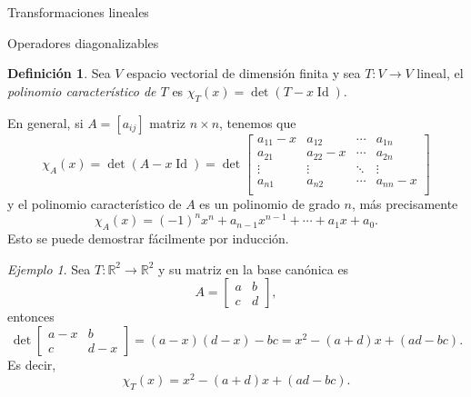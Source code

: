 \documentclass[a4paper,12pt,twoside,spanish,reqno]{amsbook}
\numberwithin{equation}{section}
\theoremstyle{definition}
\newtheorem{definicion}[teorema]{Definici\'on}
\theoremstyle{remark}
\newtheorem*{ejemplo*}{Ejemplo}
\newcommand{\Id}{\operatorname{Id}}
\newcommand{\R}{\mathbb R}
\begin{document}
\begin{chapter}{Transformaciones lineales}
\begin{section}{Operadores diagonalizables}
\begin{definicion}
            Sea $V$ espacio vectorial de dimensión finita y sea $T: V \to V$ lineal, el  \textit{polinomio característico de $T$} es $\chi_T(x) = \det(T- x \Id)$.
        \end{definicion}
    
            
        En general,  si $A = [a_{ij}]$ matriz $n \times n$, tenemos que
        \begin{equation}
        \chi_A(x) = \det(A- x\Id) = \det
        \begin{bmatrix}
        a_{11}-x&a_{12}&\cdots&a_{1n}\\
        a_{21}&a_{22}-x&\cdots&a_{2n}\\
        \vdots&\vdots&\ddots&\vdots\\
        a_{n1}&a_{n2}&\cdots&a_{nn}-x\\
        \end{bmatrix}
        \end{equation} 
        y el polinomio característico de $A$ es un polinomio  de grado $n$,  más precisamente  
        $$
        \chi_A(x) =(-1)^nx^n + a_{n-1}x^{n-1}+ \cdots + a_1x + a_0.
        $$ 
        Esto se puede demostrar fácilmente por inducción. 
        
        \begin{ejemplo*}
            Sea $T: \R^2 \to \R^2$ y su matriz en la base canónica es
            \begin{equation*}
                A = \begin{bmatrix}
                    a&b\\c&d
                \end{bmatrix},
            \end{equation*}
        entonces
        \begin{equation*}
                 \det \begin{bmatrix}
                a-x & b \\ c &d-x
                \end{bmatrix} = 
                (a-x)(d-x) - bc = x^2 -(a+d)x + (ad -bc).
        \end{equation*}
        Es decir,
        $$
        \chi_T(x) = x^2 -(a+d)x + (ad -bc).
        $$ 
        \end{ejemplo*}

    
    

\end{section}
\end{chapter}
\end{document}
